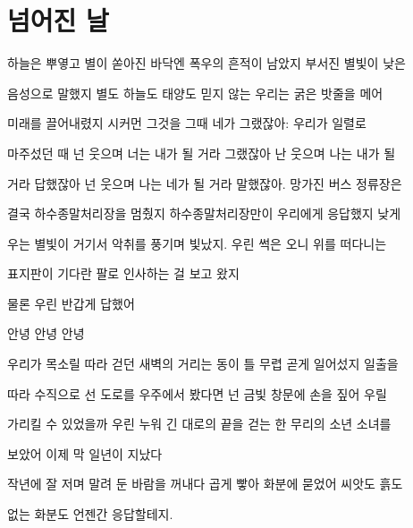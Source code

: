 \hypertarget{uxb118uxc5b4uxc9c4-uxb0a0}{%

\section{넘어진 날}\label{uxb118uxc5b4uxc9c4-uxb0a0}}



하늘은 뿌옇고 별이 쏟아진 바닥엔 폭우의 흔적이 남았지 부서진 별빛이 낮은

음성으로 말했지 별도 하늘도 태양도 믿지 않는 우리는 굵은 밧줄을 메어

미래를 끌어내렸지 시커먼 그것을 그때 네가 그랬잖아: 우리가 일렬로

마주섰던 때 넌 웃으며 너는 내가 될 거라 그랬잖아 난 웃으며 나는 내가 될

거라 답했잖아 넌 웃으며 나는 네가 될 거라 말했잖아. 망가진 버스 정류장은

결국 하수종말처리장을 멈췄지 하수종말처리장만이 우리에게 응답했지 낮게

우는 별빛이 거기서 악취를 풍기며 빛났지. 우린 썩은 오니 위를 떠다니는

표지판이 기다란 팔로 인사하는 걸 보고 왔지



물론 우린 반갑게 답했어



안녕 안녕 안녕



우리가 목소릴 따라 걷던 새벽의 거리는 동이 틀 무렵 곧게 일어섰지 일출을

따라 수직으로 선 도로를 우주에서 봤다면 넌 금빛 창문에 손을 짚어 우릴

가리킬 수 있었을까 우린 누워 긴 대로의 끝을 걷는 한 무리의 소년 소녀를

보았어 이제 막 일년이 지났다



작년에 잘 저며 말려 둔 바람을 꺼내다 곱게 빻아 화분에 묻었어 씨앗도 흙도

없는 화분도 언젠간 응답할테지.

